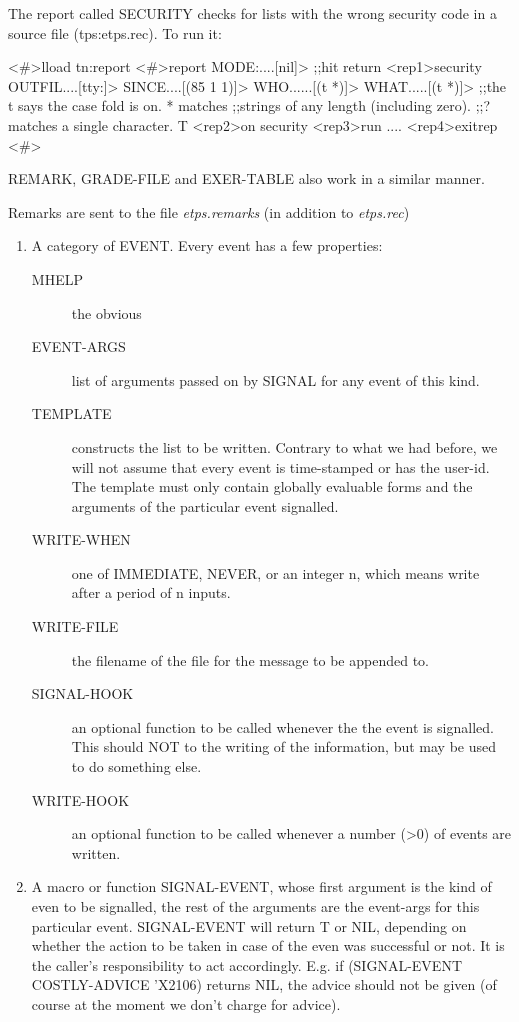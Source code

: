 The report called SECURITY checks for lists
with the wrong security code in a source file (tps:etps.rec). To run
it:
\begin{tpsexample}
<\#>lload tn:report
<\#>report
MODE:....[nil]>             ;;hit return
<rep1>security
OUTFIL....[tty:]>
SINCE....[(85 1 1)]>
WHO......[(t *)]>
WHAT.....[(t *)]>           ;;the t says the case fold is on. * matches
                            ;;strings of any length (including zero).
                            ;;? matches a single character.
T
<rep2>on security
<rep3>run
....
<rep4>exitrep
<\#>
\end{tpsexample}
REMARK, GRADE-FILE and EXER-TABLE also work in a similar manner.

Remarks are sent to the file {\it etps.remarks} (in addition to
{\it etps.rec})

\begin{enumerate}
\item A category of EVENT.  Every event has a few properties:
\begin{description}
\item[MHELP]	 the obvious

\item[EVENT-ARGS]	 list of arguments passed on by SIGNAL for any event
	of this kind.

\item[TEMPLATE]	 constructs the list to be written.  Contrary to what
	we had before, we will not assume that every event is
	time-stamped or has the user-id.  The template
        must only contain globally evaluable forms and the arguments
	of the particular event signalled.

\item[WRITE-WHEN]	 one of IMMEDIATE, NEVER, or an integer n, which means
    	write after a period of n inputs.

\item[WRITE-FILE]	 the filename of the file for the message to be
        appended to.

\item[SIGNAL-HOOK]	 an optional function to be called whenever the
	the event is signalled.  This should NOT to the writing of
	the information, but may be used to do something else.

\item[WRITE-HOOK]	 an optional function to be called whenever a number
	(>0) of events are written.
\end{description}

\item A macro or function SIGNAL-EVENT, whose first argument is the
    kind of even to be signalled, the rest of the arguments are the
    event-args for this particular event.  SIGNAL-EVENT will return
    T or NIL, depending on whether the action to be taken in case of
    the even was successful or not.  It is the caller's responsibility
    to act accordingly.  E.g. if (SIGNAL-EVENT COSTLY-ADVICE 'X2106)
    returns NIL, the advice should not be given (of course at the moment
    we don't charge for advice).
\end{enumerate}
